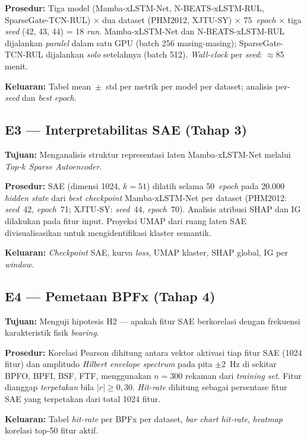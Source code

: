 \textbf{Prosedur:} Tiga model (Mamba-xLSTM-Net, N-BEATS-xLSTM-RUL,
SparseGate-TCN-RUL) × dua dataset (PHM2012, XJTU-SY) × 75~\emph{epoch}
× tiga \emph{seed} (42, 43, 44) = 18 \emph{run}.
Mamba-xLSTM-Net dan N-BEATS-xLSTM-RUL dijalankan \emph{paralel}
dalam satu GPU (batch 256 masing-masing); SparseGate-TCN-RUL
dijalankan \emph{solo} setelahnya (batch 512).
\emph{Wall-clock} per \emph{seed}: $\approx$85 menit.

\textbf{Keluaran:} Tabel mean~$\pm$~std per metrik per model per
dataset; analisis per-\emph{seed} dan \emph{best epoch}.

\subsection{E3 — Interpretabilitas SAE (Tahap 3)}
\label{subsec:bab4_e3}

\textbf{Tujuan:} Menganalisis struktur representasi laten
Mamba-xLSTM-Net melalui \emph{Top-$k$ Sparse Autoencoder}.

\textbf{Prosedur:} SAE (dimensi 1024, $k = 51$) dilatih selama
50~\emph{epoch} pada 20.000 \emph{hidden state} dari \emph{best
checkpoint} Mamba-xLSTM-Net per dataset (PHM2012: \emph{seed}~42,
\emph{epoch}~71; XJTU-SY: \emph{seed}~44, \emph{epoch}~70).
Analisis atribusi SHAP dan IG dilakukan pada fitur input.
Proyeksi UMAP dari ruang laten SAE divisualisasikan untuk mengidentifikasi
klaster semantik.

\textbf{Keluaran:} \emph{Checkpoint} SAE, kurva \emph{loss}, UMAP
klaster, SHAP global, IG per \emph{window}.

\subsection{E4 — Pemetaan BPFx (Tahap 4)}
\label{subsec:bab4_e4}

\textbf{Tujuan:} Menguji hipotesis H2 — apakah fitur SAE berkorelasi
dengan frekuensi karakteristik fisik \emph{bearing}.

\textbf{Prosedur:} Korelasi Pearson dihitung antara vektor aktivasi
tiap fitur SAE (1024 fitur) dan amplitudo \emph{Hilbert envelope
spectrum} pada pita $\pm 2$~Hz di sekitar BPFO, BPFI, BSF, FTF,
menggunakan $n = 300$ rekaman dari \emph{training set}.
Fitur dianggap \emph{terpetakan} bila $|r| \geq 0{,}30$.
\emph{Hit-rate} dihitung sebagai persentase fitur SAE yang terpetakan
dari total 1024 fitur.

\textbf{Keluaran:} Tabel \emph{hit-rate} per BPFx per dataset,
\emph{bar chart} \emph{hit-rate}, \emph{heatmap} korelasi top-50 fitur aktif.

